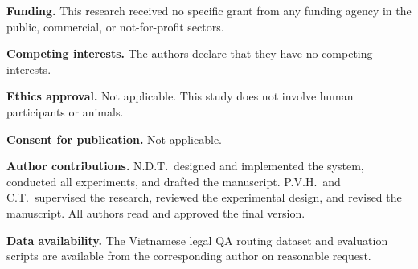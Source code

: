﻿\documentclass[11pt,twocolumn]{article}
\begin{document}
\textbf{Funding.} This research received no specific grant from any
funding agency in the public, commercial, or not-for-profit sectors.

\textbf{Competing interests.} The authors declare that they have no
competing interests.

\textbf{Ethics approval.} Not applicable. This study does not involve
human participants or animals.

\textbf{Consent for publication.} Not applicable.

\textbf{Author contributions.} N.D.T.\ designed and implemented the
system, conducted all experiments, and drafted the manuscript.
P.V.H.\ and C.T.\ supervised the research, reviewed the experimental
design, and revised the manuscript. All authors read and approved
the final version.

\textbf{Data availability.} The Vietnamese legal QA routing dataset
and evaluation scripts are available from the corresponding author on
reasonable request.



\end{document}
